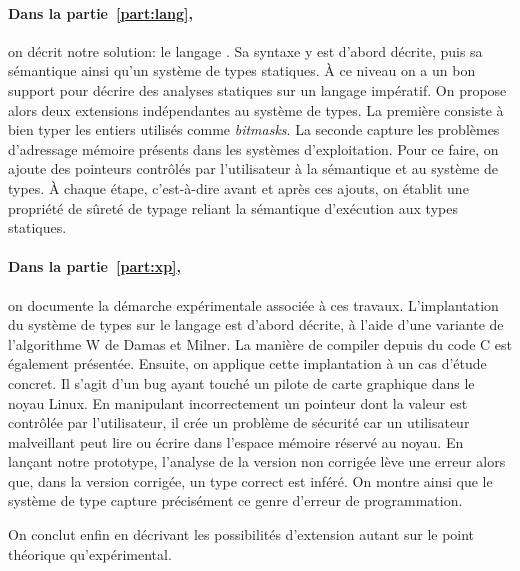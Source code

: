 \paragraph{Dans la partie~\ref{part:lang},} on décrit notre solution: le langage
\langname{}. Sa syntaxe y est d'abord décrite, puis sa sémantique ainsi qu'un
système de types statiques. À ce niveau on a un bon support pour décrire des
analyses statiques sur un langage impératif. On propose alors deux extensions
indépendantes au système de types. La première consiste à bien typer les entiers
utilisés comme \emph{bitmasks}. La seconde capture les problèmes d'adressage
mémoire présents dans les systèmes d'exploitation. Pour ce faire, on ajoute des
pointeurs contrôlés par l'utilisateur à la sémantique et au système de types. À
chaque étape, c'est-à-dire avant et après ces ajouts, on établit une propriété
de sûreté de typage reliant la sémantique d'exécution aux types statiques.

\paragraph{Dans la partie~\ref{part:xp},} on documente la démarche expérimentale
associée à ces travaux. L'implantation du système de types sur le langage
\newspeak est d'abord décrite, à l'aide d'une variante de l'algorithme W de
Damas et Milner. La manière de compiler depuis du code C est également
présentée. Ensuite, on applique cette implantation à un cas d'étude concret. Il
s'agit d'un bug ayant touché un pilote de carte graphique dans le noyau Linux.
En manipulant incorrectement un pointeur dont la valeur est contrôlée par
l'utilisateur, il crée un problème de sécurité car un utilisateur malveillant
peut lire ou écrire dans l'espace mémoire réservé au noyau. En lançant notre
prototype, l'analyse de la version non corrigée lève une erreur alors que, dans
la version corrigée, un type correct est inféré. On montre ainsi que le système
de type capture précisément ce genre d'erreur de programmation.

On conclut enfin en décrivant les possibilités d'extension autant sur le point
théorique qu'expérimental.

